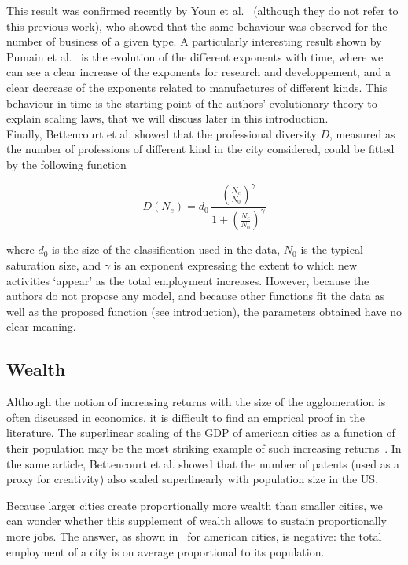 This result was confirmed recently by Youn et al.~\cite{Youn:2014} (although
they do not refer to this previous work), who showed that the same behaviour was
observed for the number of business of a given type. A particularly interesting
result shown by Pumain et al.~\cite{Pumain:2006} is the evolution of the
different exponents with time, where we can see a clear increase of the
exponents for research and developpement, and a clear decrease of the exponents
related to manufactures of different kinds. This behaviour in time is the
starting point of the authors' evolutionary theory to explain scaling laws, that
we will discuss later in this introduction.\\

Finally, Bettencourt et al.\cite{Bettencourt:2014} showed that the professional
diversity $D$, measured as the number of professions of different kind in the
city considered, could be fitted by the following function

\begin{equation}
    D(N_e) = d_0\, \frac{\left(\frac{N_e}{N_0}\right)^\gamma}{1+\left(\frac{N_e}{N_0}\right)^\gamma}
\end{equation}

where $d_0$ is the size of the classification used in the data, $N_0$ is the
typical saturation size, and $\gamma$ is an exponent expressing the extent to
which new activities `appear' as the total employment increases. However,
because the authors do not propose any model, and because other functions fit
the data as well as the proposed function (see introduction), the parameters
obtained have no clear meaning.

\subsection{Wealth}
\label{sub:wealth}

Although the notion of increasing returns with the size of the agglomeration is
often discussed in economics, it is difficult to find an emprical proof in the
literature. The superlinear scaling of the GDP of american cities as a function of
their population may be the most striking example of such increasing
returns~\cite{Bettencourt:2007}. In the same article, Bettencourt et al. showed
that the number of patents (used as a proxy for creativity) also scaled
superlinearly with population size in the US.

Because larger cities create proportionally more wealth than smaller cities, we
can wonder whether this supplement of wealth allows to sustain proportionally
more jobs. The answer, as shown in~\cite{Bettencourt:2014} for american cities,
is negative: the total employment of a city is on average proportional to its population.

